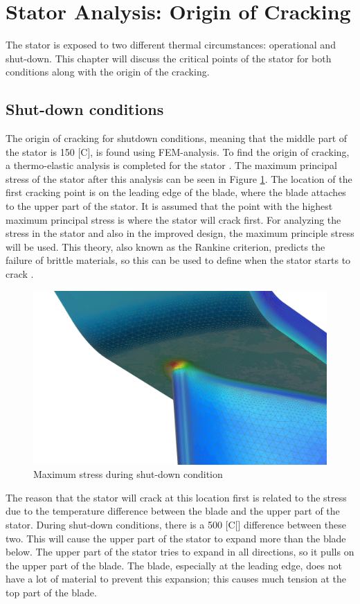 \section{Stator Analysis: Origin of Cracking}
\label{Chap:stator_analysis}
The stator is exposed to two different thermal circumstances: operational and shut-down. This chapter will discuss the critical points of the stator for both conditions along with the origin of the cracking.

\subsection{Shut-down conditions}

The origin of cracking for shutdown conditions, meaning that the middle part of the stator is 150 [\textdegree C], is found using FEM-analysis. To find the origin of cracking, a thermo-elastic analysis is completed for the stator \cite{thermo-elasticity}. The maximum principal stress of the stator after this analysis can be seen in Figure \ref{stator1}. The location of the first cracking point is on the leading edge of the blade, where the blade attaches to the upper part of the stator. It is assumed that the point with the highest maximum principal stress is where the stator will crack first. For analyzing the stress in the stator and also in the improved design, the maximum principle stress will be used. This theory, also known as the Rankine criterion, predicts the failure of brittle materials, so this can be used to define when the stator starts to crack \cite{Solidmechanics}.

\begin{figure} [H]
 	\centering
 	\includegraphics[width=0.8\linewidth]{Figures/stator_shutdown.png}
 	\caption{Maximum stress during shut-down condition}
    \label{stator1}
 \end{figure}

The reason that the stator will crack at this location first is related to the stress due to the temperature difference between the blade and the upper part of the stator. During shut-down conditions, there is a 500 [\textdegree C[] difference between these two. This will cause the upper part of the stator to expand more than the blade below. The upper part of the stator tries to expand in all directions, so it pulls on the upper part of the blade. The blade, especially at the leading edge, does not have a lot of material to prevent this expansion; this causes much tension at the top part of the blade. 

